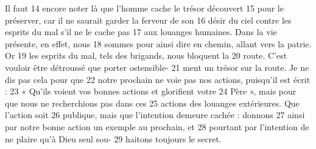 Il faut	 
14	 	encore noter là que l'homme cache le trésor découvert	 
15	 	pour le préserver, car il ne saurait garder la ferveur de son	 
16	 	désir du ciel contre les esprits du mal s'il ne le cache pas	 
17	 	aux louanges humaines. Dans la vie présente, en effet, nous	 
18	 	sommes pour ainsi dire en chemin, allant vers la patrie. Or	 
19	 	les esprits du mal, tels des brigands, nous bloquent la	 
20	 	route. C'est vouloir être détroussé que porter ostensible-	 
21	 	ment un trésor sur la route. Je ne dis pas cela pour que	 
22	 	notre prochain ne voie pas nos actions, puisqu'il est écrit :	 
23	 	« Qu'ils voient vos bonnes actions et glorifient votre	 
24	 	Père », mais pour que nous ne recherchions pas dans ces	 
25	 	actions des louanges extérieures. Que l'action soit	 
26	 	publique, mais que l'intention demeure cachée : donnons	 
27	 	ainsi par notre bonne action un exemple au prochain, et	 
28	 	pourtant par l'intention de ne plaire qu'à Dieu seul sou-	 
29	 	haitons toujours le secret.